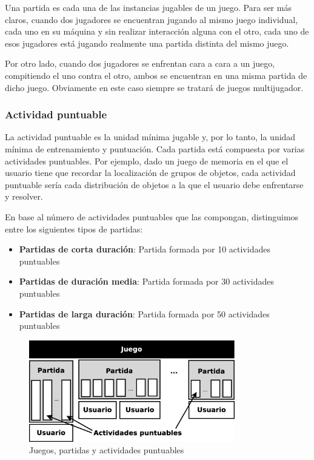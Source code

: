 Una partida es cada una de las instancias jugables de un juego. Para ser más claros, cuando dos jugadores se encuentran jugando al mismo juego individual, cada uno en su máquina y sin realizar interacción alguna con el otro, cada uno de esos jugadores está jugando realmente una partida distinta del mismo juego.

Por otro lado, cuando dos jugadores se enfrentan cara a cara a un juego, compitiendo el uno contra el otro, ambos se encuentran en una misma partida de dicho juego. Obviamente en este caso siempre se tratará de juegos multijugador.

\subsubsection{Actividad puntuable}

La actividad puntuable es la unidad mínima jugable y, por lo tanto, la unidad mínima de entrenamiento y puntuación. Cada partida está compuesta por varias actividades puntuables. Por ejemplo, dado un juego de memoria en el que el usuario tiene que recordar la localización de grupos de objetos, cada actividad puntuable sería cada distribución de objetos a la que el usuario debe enfrentarse y resolver.

En base al número de actividades puntuables que las compongan, distinguimos entre los siguientes tipos de partidas:

\begin{itemize}
\item {\bf Partidas de corta duración}: Partida formada por 10 actividades puntuables
\item {\bf Partidas de duración media}: Partida formada por 30 actividades puntuables
\item {\bf Partidas de larga duración}: Partida formada por 50 actividades puntuables
\end{itemize}

\begin{figure}[H]
  \begin{center}
    \includegraphics[width=0.8\textwidth]{images/juegos-partidas-actividades.eps}
    \caption{Juegos, partidas y actividades puntuables}
    \label{fig::juegos-partidas-actividades}
  \end{center}
\end{figure}

